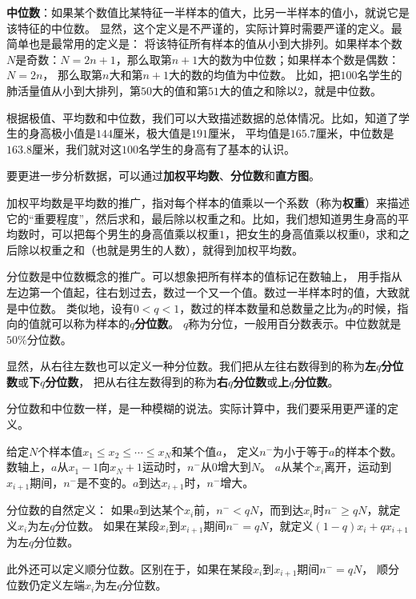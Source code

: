\documentclass[12pt,UTF8,fontset=none]{ctexbook}
\begin{document}
\textbf{中位数}：如果某个数值比某特征一半样本的值大，比另一半样本的值小，就说它是该特征的中位数。
显然，这个定义是不严谨的，实际计算时需要严谨的定义。最简单也是最常用的定义是：
将该特征所有样本的值从小到大排列。如果样本个数$N$是奇数：$N = 2n + 1$，那么取第$n+1$大的数为中位数；如果样本个数是偶数：$N=2n$，
那么取第$n$大和第$n+1$大的数的均值为中位数。
比如，把$100$名学生的肺活量值从小到大排列，第$50$大的值和第$51$大的值之和除以$2$，就是中位数。

根据极值、平均数和中位数，我们可以大致描述数据的总体情况。比如，知道了学生的身高极小值是$144$厘米，极大值是$191$厘米，
平均值是$165.7$厘米，中位数是$163.8$厘米，我们就对这$100$名学生的身高有了基本的认识。

要更进一步分析数据，可以通过\textbf{加权平均数}、\textbf{分位数}和\textbf{直方图}。

加权平均数是平均数的推广，指对每个样本的值乘以一个系数（称为\textbf{权重}）来描述它的“重要程度”，然后求和，最后除以权重之和。比如，我们想知道男生身高的平均数时，可以把每个男生的身高值乘以权重$1$，把女生的身高值乘以权重$0$，求和之后除以权重之和（也就是男生的人数），就得到加权平均数。

分位数是中位数概念的推广。可以想象把所有样本的值标记在数轴上，
用手指从左边第一个值起，往右划过去，数过一个又一个值。数过一半样本时的值，大致就是中位数。
类似地，设有$0 < q < 1$，数过的样本数量和总数量之比为$q$的时候，指向的值就可以称为样本的$q$\textbf{分位数}。
$q$称为分位，一般用百分数表示。中位数就是$50\%$分位数。

显然，从右往左数也可以定义一种分位数。我们把从左往右数得到的称为\textbf{左}$q$\textbf{分位数}或\textbf{下}$q$\textbf{分位数}，
把从右往左数得到的称为\textbf{右}$q$\textbf{分位数}或\textbf{上}$q$\textbf{分位数}。

分位数和中位数一样，是一种模糊的说法。实际计算中，我们要采用更严谨的定义。

给定$N$个样本值$x_1 \leqslant x_2  \leqslant  \cdots  \leqslant x_N$和某个值$a$，
定义$n^{-}$为小于等于$a$的样本个数。
数轴上，$a$从$x_1 - 1$向$x_N + 1$运动时，$n^-$从$0$增大到$N$。
$a$从某个$x_i$离开，运动到$x_{i+1}$期间，$n^-$是不变的。$a$到达$x_{i+1}$时，$n^-$增大。

分位数的自然定义：
如果$a$到达某个$x_{i}$前，$n^- < qN$，而到达$x_{i}$时$n^- \geqslant qN$，就定义$x_{i}$为左$q$分位数。
如果在某段$x_i$到$x_{i+1}$期间$n^- = qN$，就定义$(1 - q)x_{i} + qx_{i+1}$为左$q$分位数。

此外还可以定义顺分位数。区别在于，如果在某段$x_i$到$x_{i+1}$期间$n^- = qN$，
顺分位数仍定义左端$x_i$为左$q$分位数。
\end{document}
